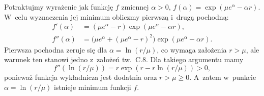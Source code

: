 \exercise %
Potraktujmy wyrażenie jak funkcję $f$ zmiennej $\alpha>0$, $f(\alpha)=\exp(\mu e^\alpha-\alpha r).$ W~celu wyznaczenia jej minimum obliczmy pierwszą i~drugą pochodną:
\begin{align*}
	f'(\alpha) &= (\mu e^\alpha-r)\exp(\mu e^\alpha-\alpha r), \\
	f''(\alpha) &= \bigl(\mu e^\alpha+(\mu e^\alpha-r)^2\bigr)\exp(\mu e^\alpha-\alpha r).
\end{align*}
Pierwsza pochodna zeruje się dla $\alpha=\ln(r/\mu)$, co wymaga założenia $r>\mu$, ale warunek ten stanowi jedno z~założeń tw.\ C.8.
Dla takiego argumentu mamy
\[
	f''(\ln(r/\mu)) = r\exp(r-r\ln(r/\mu)) > 0,
\]
ponieważ funkcja wykładnicza jest dodatnia oraz $r>\mu\ge0$.
A~zatem w~punkcie $\alpha=\ln(r/\mu)$ istnieje minimum funkcji $f$.
